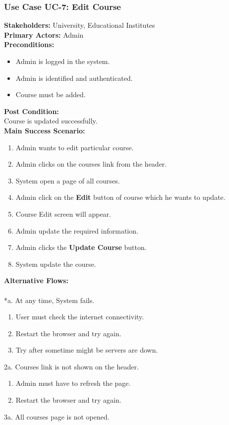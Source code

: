 \documentclass[12pt]{article}
\begin{document}
\subsubsection{Use Case UC-7: Edit Course}
\textbf{Stakeholders: } University, Educational Institutes \\
\textbf{Primary Actors: } Admin \\
\textbf{Preconditions:}
\begin{itemize}
\item Admin is logged in the system.
\item Admin is identified and authenticated.
\item Course must be added.
\end{itemize}
\textbf{Post Condition: }\\
Course is updated successfully.\\
\newpage
\textbf{Main Success Scenario:}
\begin{enumerate}
\item Admin wants to edit particular course.
\item Admin clicks on the courses link from the header.
\item System open a page of all courses.
\item Admin click on the \textbf{Edit} button of course which he wants to update.
\item Course Edit screen will appear.
\item Admin update the required information.
\item Admin clicks the \textbf{Update Course} button.
\item System update the course.
\end{enumerate}
\textbf{Alternative Flows:}\\
\\
*a. At any time, System fails.
\begin{enumerate}
\item User must check the internet connectivity.
\item Restart the browser and try again.
\item Try after sometime might be servers are down.
\end{enumerate}
2a. Courses link is not shown on the header.
\begin{enumerate}
\item Admin must have to refresh the page.
\item Restart the browser and try again.
\end{enumerate} 
3a. All courses page is not opened.
\end{document}

